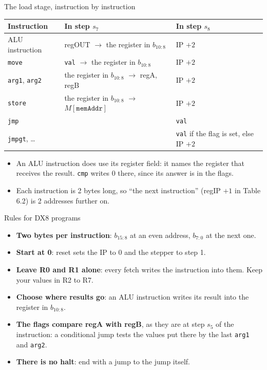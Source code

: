 \documentclass[10pt]{wosm-slides}
\begin{document}
\begin{frame}{The load stage, instruction by instruction}
  \begin{center}
    \begin{tabular}{@{}lll@{}}
      \toprule
      Instruction & In step $s_7$ & In step $s_8$ \\
      \midrule
      ALU instruction & regOUT $\to$ the register in $b_{10:8}$ & IP $+ 2$ \\
      \texttt{move} & \texttt{val} $\to$ the register in $b_{10:8}$ & IP $+ 2$ \\
      \texttt{arg1}, \texttt{arg2} & the register in $b_{10:8}$ $\to$ regA, regB
        & IP $+ 2$ \\
      \texttt{store} & the register in $b_{10:8}$ $\to$ $M[\texttt{memAddr}]$
        & IP $+ 2$ \\
      \texttt{jmp} & & \texttt{val} \\
      \texttt{jmpgt}, \ldots & & \texttt{val} if the flag is set, else IP $+ 2$ \\
      \bottomrule
    \end{tabular}
  \end{center}

  \begin{itemize}
    \item An ALU instruction does use its register field: it names the register that
      receives the result. \texttt{cmp} writes 0 there, since its answer is in the
      flags.
    \item Each instruction is 2 bytes long, so ``the next instruction'' (regIP $+ 1$
      in Table 6.2) is 2 addresses further on.
  \end{itemize}
\end{frame}

\begin{frame}{Rules for DX8 programs}
  \begin{itemize}
    \item \textbf{Two bytes per instruction}: $b_{15:8}$ at an even address, $b_{7:0}$
      at the next one.
    \item \textbf{Start at 0}: reset sets the IP to 0 and the stepper to step 1.
    \item \textbf{Leave R0 and R1 alone}: every fetch writes the instruction into
      them. Keep your values in R2 to R7.
    \item \textbf{Choose where results go}: an ALU instruction writes its result into
      the register in $b_{10:8}$.
    \item \textbf{The flags compare regA with regB}, as they are at step $s_5$ of the
      instruction: a conditional jump tests the values put there by the last
      \texttt{arg1} and \texttt{arg2}.
    \item \textbf{There is no halt}: end with a jump to the jump itself.
  \end{itemize}
\end{frame}
\end{document}
